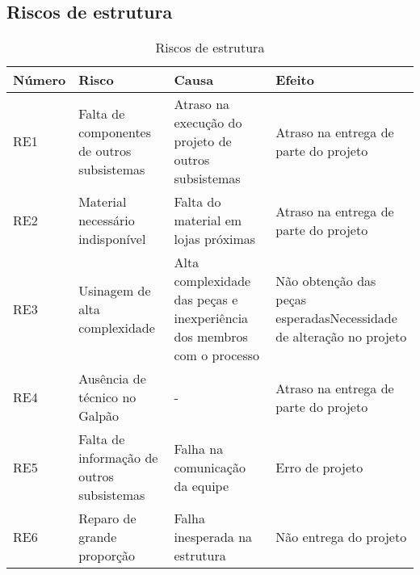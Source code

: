 \subsection{Riscos de estrutura}

\begin{table}[h]
   \centering
\begin{tabular}{p{0.5in}p{1.5in}p{1.5in}p{1.5in}}
Número &Risco&Causa&Efeito\\ \hline
RE1   & Falta de componentes de outros subsistemas & Atraso na execução do projeto de outros subsistemas                    & Atraso na entrega de parte do projeto                               \\ \hline
RE2   & Material necessário indisponível           & Falta do material em lojas próximas                                    & Atraso na entrega de parte do projeto                               \\ \hline
RE3   & Usinagem de alta complexidade              & Alta complexidade das peças e inexperiência dos membros com o processo & Não obtenção das peças esperadasNecessidade de alteração no projeto \\ \hline
RE4   & Ausência de técnico no Galpão              & -                                                                      & Atraso na entrega de parte do projeto                               \\ \hline
RE5   & Falta de informação de outros subsistemas  & Falha na comunicação da equipe                                         & Erro de projeto                                                     \\ \hline
RE6   & Reparo de grande proporção                 & Falha inesperada na estrutura                                          & Não entrega do projeto                                              \\ \hline
\end{tabular}
\caption{Riscos de estrutura}
\label{riscoestrut}
\end{table}
